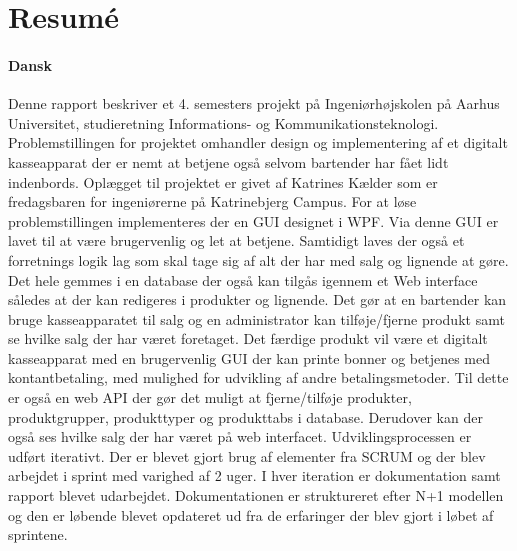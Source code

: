 \chapter{Resumé}
\subsubsection*{Dansk}

Denne rapport beskriver et 4. semesters projekt på Ingeniørhøjskolen på Aarhus Universitet, studieretning Informations- og Kommunikationsteknologi. 
Problemstillingen for projektet omhandler design og implementering af et digitalt kasseapparat der er nemt at betjene også selvom bartender har fået lidt indenbords. 
Oplægget til projektet er givet af Katrines Kælder som er fredagsbaren for ingeniørerne på Katrinebjerg Campus.
\newline
\newline
For at løse problemstillingen implementeres der en \gls{GUI} designet i \gls{WPF}. Via denne 
\gls{GUI} er lavet til at være brugervenlig og let at betjene. 
Samtidigt laves der også et forretnings logik lag som skal tage sig af alt der har med salg og lignende at gøre. 
Det hele gemmes i en database der også kan tilgås igennem et Web interface således at der kan redigeres i produkter og lignende. 
Det gør at en bartender kan bruge kasseapparatet til salg og en administrator kan tilføje/fjerne produkt samt se hvilke salg der har været foretaget.
\newline
\newline
Det færdige produkt vil være et digitalt kasseapparat med en brugervenlig \gls{GUI} 
der kan printe bonner og betjenes med kontantbetaling, med mulighed for udvikling af andre betalingsmetoder. 
Til dette er også en web API der gør det muligt at fjerne/tilføje produkter, produktgrupper, produkttyper og produkttabs i database. 
Derudover kan der også ses hvilke salg der har været på web interfacet.
\newline
\newline
Udviklingsprocessen er udført iterativt. 
Der er blevet gjort brug af elementer fra SCRUM og der blev arbejdet i sprint med varighed af 2 uger. 
I hver iteration er dokumentation samt rapport blevet udarbejdet. 
Dokumentationen er struktureret efter N+1 modellen og den er løbende blevet opdateret ud fra de erfaringer der blev gjort i løbet af sprintene.   
\newline
\newline
















